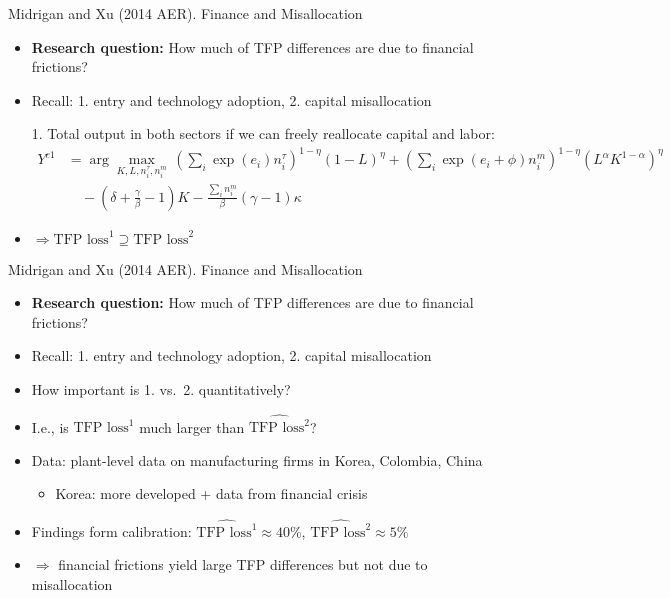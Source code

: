 \documentclass[aspectratio=169,compress,t,xcolor=table]{beamer}
\begin{document}
\begin{frame}{}
Midrigan and Xu (2014 AER). Finance and Misallocation
  \begin{itemize}
    \item {\color{MyStructure}\textbf{Research question:}} How much of TFP differences are due to financial frictions?
    \item Recall: {\color{MyStructure}1.} entry and technology adoption, {\color{MyStructure}2.} capital misallocation
    \vfill\item[1.] Total output in both sectors if we can freely reallocate capital and labor:
    \begin{align*}
      Y^{e1} &= \arg\max_{K, L, n^{\tau}_i, n^m_i} \, \left( \sum_i \exp(e_i) n^{\tau}_i \right)^{1-\eta} (1-L)^{\eta} + \left( \sum_i \exp(e_i + \phi) n^m_i \right)^{1-\eta} (L^{\alpha} K^{1-\alpha})^{\eta} \\
      &\quad - \left( \delta + \frac{\gamma}{\beta} -1 \right) K - \frac{\sum_i n^m_i}{\beta} (\gamma-1)\kappa
    \end{align*}
    \vfill\item \(\Rightarrow \text{TFP loss}^1 \supseteq \text{TFP loss}^2\)
  \end{itemize}
\end{frame}

\begin{frame}{}
Midrigan and Xu (2014 AER). Finance and Misallocation
  \begin{itemize}
    \item {\color{MyStructure}\textbf{Research question:}} How much of TFP differences are due to financial frictions?
    \item Recall: {\color{MyStructure}1.} entry and technology adoption, {\color{MyStructure}2.} capital misallocation
    \vfill\item How important is {\color{MyStructure}1.} vs.\ {\color{MyStructure}2.} quantitatively?
    \item I.e., is \(\widehat{\text{TFP loss}^1}\) much larger than \(\widehat{\text{TFP loss}^2}\)?
    \vfill\item Data: plant-level data on manufacturing firms in Korea, Colombia, China
    \begin{itemize}
      \item Korea: more developed + data from financial crisis
    \end{itemize}
    \vfill\item Findings form calibration: \(\widehat{\text{TFP loss}^1} \approx 40\%\),  \(\widehat{\text{TFP loss}^2} \approx 5\%\)
    \vfill\item \(\Rightarrow\) financial frictions yield large TFP differences but not due to misallocation
  \end{itemize}
\end{frame}
\end{document}
